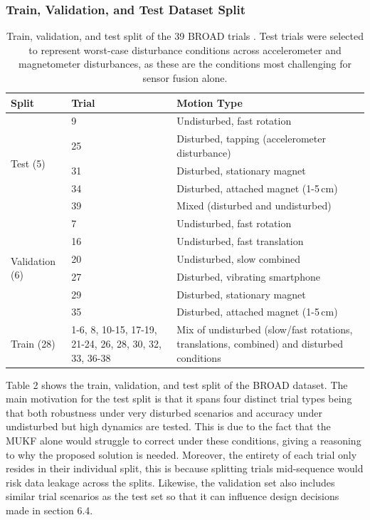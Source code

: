 \subsubsection{Train, Validation, and Test Dataset Split}
\begin{table}[!htbp]
\centering
\small
\begin{tabular}{p{2.5cm} p{2.5cm} p{7cm}}
\hline
\textbf{Split} & \textbf{Trial} & \textbf{Motion Type} \\
\hline
\multirow{5}{*}{Test (5)}
  & 9  & Undisturbed, fast rotation \\
  & 25 & Disturbed, tapping (accelerometer disturbance) \\
  & 31 & Disturbed, stationary magnet \\
  & 34 & Disturbed, attached magnet (1-5\,cm) \\
  & 39 & Mixed (disturbed and undisturbed) \\
\hline
\multirow{6}{*}{Validation (6)}
  & 7  & Undisturbed, fast rotation \\
  & 16 & Undisturbed, fast translation \\
  & 20 & Undisturbed, slow combined \\
  & 27 & Disturbed, vibrating smartphone \\
  & 29 & Disturbed, stationary magnet \\
  & 35 & Disturbed, attached magnet (1-5\,cm) \\
\hline
Train (28) & 1-6, 8, 10-15, 17-19, 21-24, 26, 28, 30, 32, 33, 36-38 & Mix of undisturbed (slow/fast rotations, translations, combined) and disturbed conditions \\
\hline
\end{tabular}
\caption{Train, validation, and test split of the 39 BROAD trials \cite{laidig_2021_broada}. Test trials were selected to represent worst-case disturbance conditions across accelerometer and magnetometer disturbances, as these are the conditions most challenging for sensor fusion alone.}
\label{tab:dataset_split}
\end{table}

Table 2 shows the train, validation, and test split of the BROAD dataset. The main motivation for the test split is that it spans 
four distinct trial types being that both robustness under very disturbed scenarios and accuracy under undisturbed but high dynamics are tested.
This is due to the fact that the MUKF alone would struggle to correct under these conditions, giving a reasoning to why the proposed solution is needed. 
Moreover, the entirety of each trial only resides in their individual split, this is because splitting trials mid-sequence would risk data leakage across
the splits. Likewise, the validation set also includes similar trial scenarios as the test set so that it can influence design decisions made in section 6.4.

